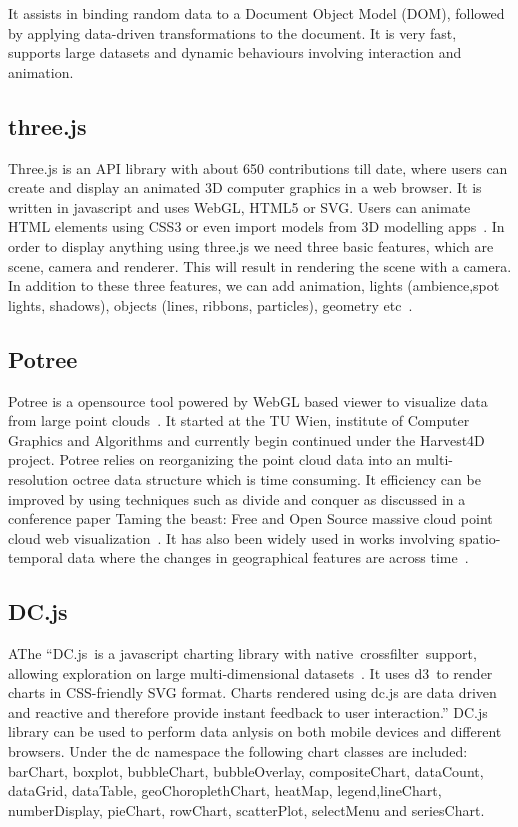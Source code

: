     It assists in binding random data to a Document Object Model
    (DOM), followed by applying data-driven transformations to the
    document. It is very fast, supports large datasets and dynamic
    behaviours involving interaction and animation.

    
\subsection{three.js}

Three.js is an API library with about 650 contributions till date,
where users can create and display an animated 3D computer graphics in
a web browser. It is written in javascript and uses WebGL, HTML5 or
SVG. Users can animate HTML elements using CSS3 or even import models
from 3D modelling apps~\cite{www-threejs-wiki}. In order to display
anything using three.js we need three basic features, which are scene,
camera and renderer. This will result in rendering the scene with a
camera. In addition to these three features, we can add animation,
lights (ambience,spot lights, shadows), objects (lines, ribbons,
particles), geometry etc~\cite{www-threejs-webpage}.
    
\subsection{Potree }

Potree is a opensource tool powered by WebGL based viewer to visualize
data from large point clouds~\cite{www-potree}.  It started at the TU
Wien, institute of Computer Graphics and Algorithms and currently
begin continued under the Harvest4D project. Potree relies on
reorganizing the point cloud data into an multi-resolution octree data
structure which is time consuming. It efficiency can be improved by
using techniques such as divide and conquer as discussed in a
conference paper Taming the beast: Free and Open Source massive cloud
point cloud web visualization~\cite{potree-paper-1}. It has also been
widely used in works involving spatio-temporal data where the changes
in geographical features are across time~\cite{potree-paper-2}.

    \pv
    
\subsection{DC.js}

AThe ``DC.js is a javascript charting library with
native crossfilter support, allowing exploration on large
multi-dimensional datasets~\cite{www-dcjs}. It uses d3 to render
charts in CSS-friendly SVG format. Charts rendered using dc.js are
data driven and reactive and therefore provide instant feedback to
user interaction.'' DC.js library can be used to perform data anlysis
on both mobile devices and different browsers. Under the dc namespace
the following chart classes are included: barChart, boxplot,
bubbleChart, bubbleOverlay, compositeChart, dataCount, dataGrid,
dataTable, geoChoroplethChart, heatMap, legend,lineChart,
numberDisplay, pieChart, rowChart, scatterPlot, selectMenu and
seriesChart.

